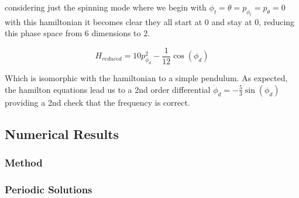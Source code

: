 \documentclass[12pt]{amsart}
\begin{document}
considering just the spinning mode where we begin with $\phi_t=\theta=p_{\phi_t}=p_\theta=0$ with this hamiltonian it becomes clear they all start at 0 and stay at 0, reducing this phase space from 6 dimensions to 2.

\begin{equation}
	H_{reduced}=
	10 p_{\phi_d}^2 
	-
	\frac{1}{12}
        \cos(\phi_d)
\end{equation}

Which is isomorphic with the hamiltonian to a simple pendulum. As expected, the hamilton equations lead us to  a 2nd order differential $\ddot \phi_d = - \frac{5}{3}\sin(\phi_d)$ providing a 2nd check that the frequency is correct.

\subsection{Numerical Results}
\subsubsection{Method}
\subsubsection{Periodic Solutions}
\end{document}
